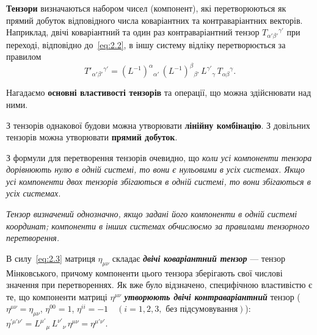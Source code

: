 
\textbf{Тензори} визначаються набором чисел (компонент), які перетворюються як прямий добуток відповідного числа
коваріантних та контраваріантних векторів. Наприклад, двічі коваріантний та один раз контраваріантний тензор
$T_{\alpha'\beta'}{}^{\gamma'}$ при переході, відповідно до~\eqref{eq:2.2}, в іншу систему відліку перетворюється за
правилом
\begin{equation*}
  T'_{\alpha'\beta'}{}^{\gamma'} =
  (L^{-1})^\alpha{}_{\alpha'}\,(L^{-1})^\beta{}_{\beta'}\,
  L^{\gamma'}{}_\gamma\, T_{\alpha\beta}{}^\gamma.
\end{equation*}

Нагадаємо \textbf{основні властивості тензорів} та операції, що можна здійснювати над ними.

З тензорів однакової будови можна утворювати \textbf{лінійну комбінацію}. З довільних тензорів можна утворювати
\textbf{прямий добуток}.

З формули для перетворення тензорів очевидно, що \textit{коли усі компоненти тензора дорівнюють нулю в одній системі, то
  вони є нульовими в усіх системах. Якщо усі компоненти двох тензорів збігаються в одній системі, то вони збігаються в
  усіх системах.}

\textit{Тензор визначений однозначно, якщо задані його компоненти в одній системі координат; компоненти в інших системах
  обчислюємо за правилами тензорного перетворення.}

В силу~\eqref{eq:2.3} матриця $\eta_{\mu\nu}$ складає \textit{\textbf{двічі коваріантний тензор}} --- тензор
Мінковського, причому компоненти цього тензора зберігають свої числові значення при перетвореннях. Як вже було
відзначено, специфічною властивістю є те, що компоненти матриці $\eta^{\mu\nu}$ \textbf{\textit{утворюють двічі
контраваріантний}} тензор ($\eta^{\mu\nu} = \eta_{\mu\nu}$, $\eta^{00}=1$, $\eta^{ii}=-1 \quad (i=1,2,3, \text{ без
підсумовування})$): $\eta^{\prime\mu'\nu'} = L^{\mu'}{}_\mu\, L^{\nu'}{}_\nu\, \eta^{\mu\nu} = \eta^{\mu'\nu'}$.

